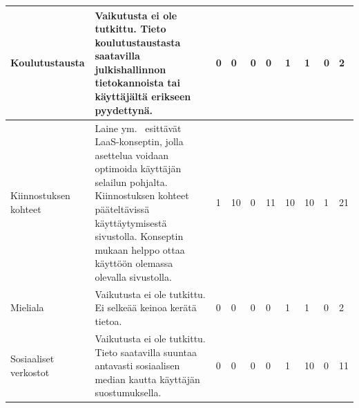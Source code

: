 \documentclass[finnish, 12pt, a4paper, elec, utf8, a-1b]{aaltothesis}
\begin{document}
{\begin{longtable}{p{2.5cm}|p{6cm}|p{0.5cm}p{0.5cm}p{0.5cm}|p{0.5cm}|p{0.5cm}p{0.5cm}p{0.5cm}|p{0.5cm}|}
    \midrule
    Koulutustausta                          & Vaikutusta ei ole tutkittu. Tieto koulutustaustasta saatavilla julkishallinnon tietokannoista tai käyttäjältä erikseen pyydettynä.                                                                                                                                                                                                                                      & 0                                          & 0                                   & 0                                      & 0                            & 1                                               & 1                                         & 0                                         & 2                            \\
    \midrule
    Kiinnostuksen kohteet                   & Laine ym.~\cite{laine2020_laas} esittävät LaaS-konseptin, jolla asettelua voidaan optimoida käyttäjän selailun pohjalta. Kiinnostuksen kohteet pääteltävissä käyttäytymisestä sivustolla. Konseptin mukaan helppo ottaa käyttöön olemassa olevalla sivustolla.                                                                                                           & 1                                          & 10                                  & 0                                      & 11                           & 10                                              & 10                                        & 1                                         & 21                           \\
    \midrule
    Mieliala                                & Vaikutusta ei ole tutkittu. Ei selkeää keinoa kerätä tietoa.                                                                                                                                                                                                                                                                                                            & 0                                          & 0                                   & 0                                      & 0                            & 1                                               & 1                                         & 0                                         & 2                            \\
    \midrule
    Sosiaaliset verkostot                   & Vaikutusta ei ole tutkittu. Tieto saatavilla suuntaa antavasti sosiaalisen median kautta käyttäjän suostumuksella.                                                                                                                                                                                                                                                      & 0                                          & 0                                   & 0                                      & 0                            & 1                                               & 10                                        & 0                                         & 11                           \\

\end{longtable}}
\end{document}
